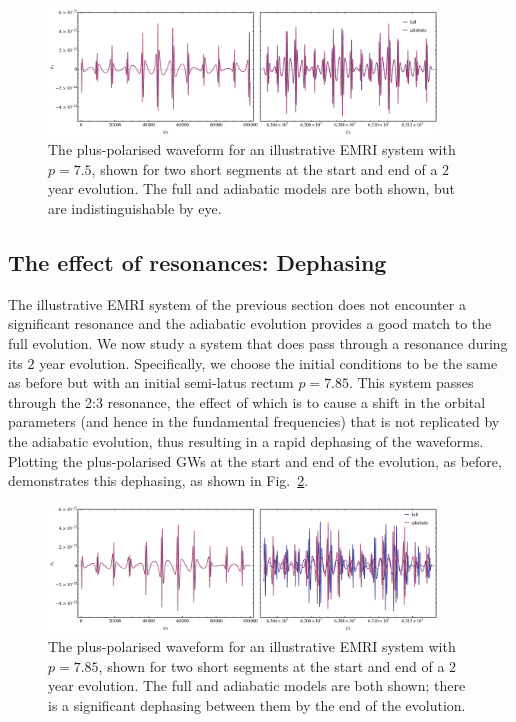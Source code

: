 \documentclass[aps,prd,amsfonts,amssymb,amsmath,nofootinbib,reprint,showpacs,superscriptaddress,twocolumn]{revtex4}
\newcommand{\figref}[1]{Fig.\ \ref{fig:#1}}
\begin{document}
\begin{figure}[htbp]
\centering
\includegraphics[width=0.92\textwidth]{Fig_good_waveform}
\caption{\label{fig:good-waveform}The plus-polarised waveform for an illustrative EMRI system with $p=7.5$, shown for two short segments at the start and end of a $2$ year evolution. The full and adiabatic models are both shown, but are indistinguishable by eye.}
\end{figure}

\subsection{The effect of resonances: Dephasing}

The illustrative EMRI system of the previous section does not encounter a significant resonance and the adiabatic evolution provides a good match to the full evolution. We now study a system that does pass through a resonance during its $2$ year evolution. Specifically, we choose the initial conditions to be the same as before but with an initial semi-latus rectum $p=7.85$. This system passes through the 2:3 resonance, the effect of which is to cause a shift in the orbital parameters (and hence in the fundamental frequencies) that is not replicated by the adiabatic evolution, thus resulting in a rapid dephasing of the waveforms. Plotting the plus-polarised GWs at the start and end of the evolution, as before, demonstrates this dephasing, as shown in \figref{dephased-waveform}.

\begin{figure}[htbp]
\centering
\includegraphics[width=0.92\textwidth]{Fig_dephased_waveform}
\caption{\label{fig:dephased-waveform}The plus-polarised waveform for an illustrative EMRI system with $p=7.85$, shown for two short segments at the start and end of a $2$ year evolution. The full and adiabatic models are both shown; there is a significant dephasing between them by the end of the evolution.}
\end{figure}
\end{document}
